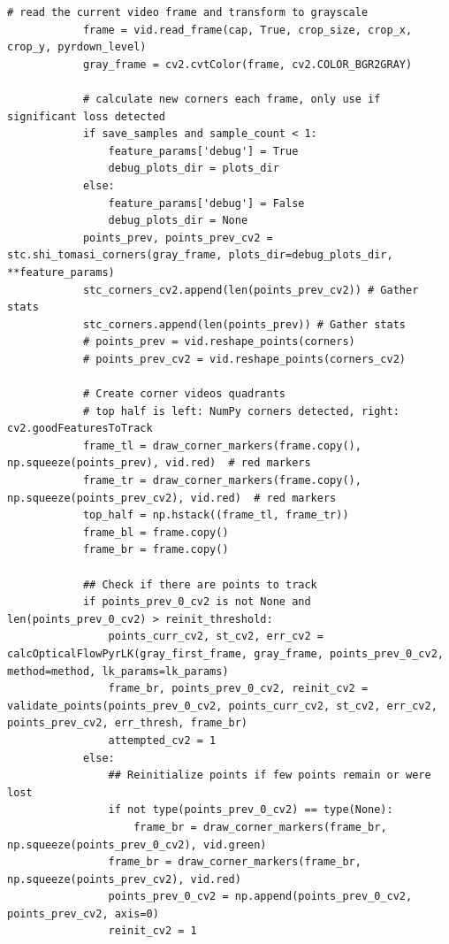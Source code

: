 \documentclass[11pt, conference, letterpaper]{IEEEtran}
\begin{document}
\begin{lstlisting}[style=python, caption={\texttt{lucas\_kanade.py}}, label={lst:lk}]
            # read the current video frame and transform to grayscale        
            frame = vid.read_frame(cap, True, crop_size, crop_x, crop_y, pyrdown_level)
            gray_frame = cv2.cvtColor(frame, cv2.COLOR_BGR2GRAY)
            
            # calculate new corners each frame, only use if significant loss detected
            if save_samples and sample_count < 1:
                feature_params['debug'] = True
                debug_plots_dir = plots_dir
            else:
                feature_params['debug'] = False
                debug_plots_dir = None
            points_prev, points_prev_cv2 = stc.shi_tomasi_corners(gray_frame, plots_dir=debug_plots_dir, **feature_params)
            stc_corners_cv2.append(len(points_prev_cv2)) # Gather stats
            stc_corners.append(len(points_prev)) # Gather stats
            # points_prev = vid.reshape_points(corners)
            # points_prev_cv2 = vid.reshape_points(corners_cv2)
    
            # Create corner videos quadrants
            # top half is left: NumPy corners detected, right: cv2.goodFeaturesToTrack 
            frame_tl = draw_corner_markers(frame.copy(), np.squeeze(points_prev), vid.red)  # red markers
            frame_tr = draw_corner_markers(frame.copy(), np.squeeze(points_prev_cv2), vid.red)  # red markers
            top_half = np.hstack((frame_tl, frame_tr))
            frame_bl = frame.copy()
            frame_br = frame.copy()
            
            ## Check if there are points to track
            if points_prev_0_cv2 is not None and len(points_prev_0_cv2) > reinit_threshold:
                points_curr_cv2, st_cv2, err_cv2 = calcOpticalFlowPyrLK(gray_first_frame, gray_frame, points_prev_0_cv2, method=method, lk_params=lk_params)
                frame_br, points_prev_0_cv2, reinit_cv2 = validate_points(points_prev_0_cv2, points_curr_cv2, st_cv2, err_cv2, points_prev_cv2, err_thresh, frame_br)
                attempted_cv2 = 1
            else:
                ## Reinitialize points if few points remain or were lost
                if not type(points_prev_0_cv2) == type(None):
                    frame_br = draw_corner_markers(frame_br, np.squeeze(points_prev_0_cv2), vid.green)
                frame_br = draw_corner_markers(frame_br, np.squeeze(points_prev_cv2), vid.red)
                points_prev_0_cv2 = np.append(points_prev_0_cv2, points_prev_cv2, axis=0)
                reinit_cv2 = 1
            

\end{lstlisting}
\end{document}
